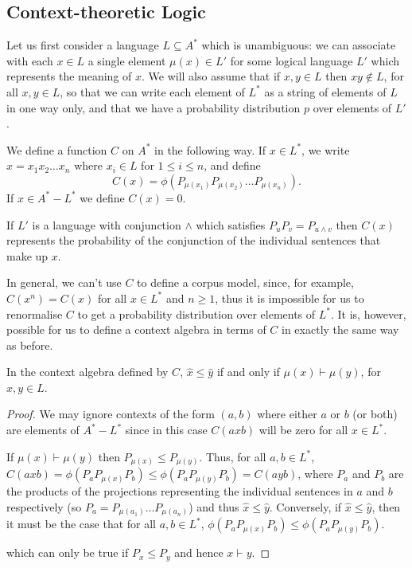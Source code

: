 
\subsection{Context-theoretic Logic}

Let us first consider a language $L\subseteq A^*$ which is unambiguous: we can associate with each $x \in L$ a single element $\mu(x) \in L'$ for some logical language $L'$ which represents the meaning of $x$. We will also assume that if $x,y \in L$ then $xy \notin L$, for all $x,y \in L$, so that we can write each element of $L^*$ as a string of elements of $L$ in one way only, and that we have a probability distribution $p$ over elements of $L'$.

\begin{defn}
We define a function $C$ on $A^*$ in the following way. If $x \in L^*$, we write $x = x_1x_2\ldots x_n$ where $x_i \in L$ for $1\le i \le n$, and define
$$C(x) = \phi(P_{\mu(x_1)}P_{\mu(x_2)}\ldots P_{\mu(x_n)}).$$
If $x \in A^* - L^*$ we define $C(x) = 0$.
\end{defn}
If $L'$ is a language with conjunction $\land$ which satisfies $P_{u}P_{v} = P_{u\land v}$ then $C(x)$ represents the probability of the conjunction of the individual sentences that make up $x$.

In general, we can't use $C$ to define a corpus model, since, for example, $C(x^n) = C(x)$ for all $x\in L^*$ and $n \ge 1$, thus it is impossible for us to renormalise $C$ to get a probability distribution over elements of $L^*$. It is, however, possible for us to define a context algebra in terms of $C$ in exactly the same way as before.

\begin{prop}
In the context algebra defined by $C$, $\hat{x} \le \hat{y}$ if and only if $\mu(x) \vdash \mu(y)$, for $x, y \in L$.
\end{prop}

\begin{proof}
We may ignore contexts of the form $(a,b)$ where either $a$ or $b$ (or both) are elements of $A^* - L^*$ since in this case $C(axb)$ will be zero for all $x \in L^*$.

If $\mu(x) \vdash \mu(y)$ then $P_{\mu(x)} \le P_{\mu(y)}$. Thus, for all $a,b \in L^*$, $C(axb) = \phi(P_aP_{\mu(x)}P_b) \le \phi(P_aP_{\mu(y)}P_b) = C(ayb)$, where $P_a$ and $P_b$ are the products of the projections representing the individual sentences in $a$ and $b$ respectively (so $P_a = P_{\mu(a_1)}\ldots P_{\mu(a_n)}$) and thus $\hat{x} \le \hat{y}$. Conversely, if $\hat{x} \le \hat{y}$, then it must be the case that for all $a,b \in L^*$, $\phi(P_aP_{\mu(x)}P_b) \le \phi(P_aP_{\mu(y)}P_b)$.

which can only be true if $P_x \le P_y$ and hence $x\vdash y$.
\end{proof}

